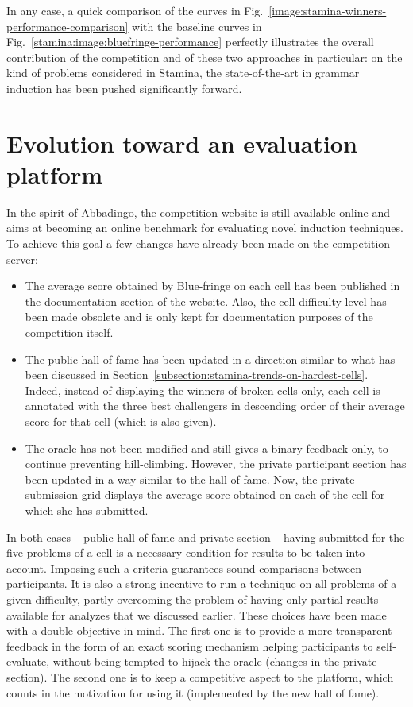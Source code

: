 In any case, a quick comparison of the curves in Fig.~\ref{image:stamina-winners-performance-comparison} with the baseline curves in Fig.~\ref{stamina:image:bluefringe-performance} perfectly illustrates the overall contribution of the competition and of these two approaches in particular: on the kind of problems considered in Stamina, the state-of-the-art in grammar induction has been pushed significantly forward.


\section{Evolution toward an evaluation platform\label{section:stamina-platform}}

In the spirit of Abbadingo, the competition website is still available online and aims at becoming an online benchmark for evaluating novel induction techniques. To achieve this goal a few changes have already been made on the competition server:

\begin{itemize}

\item The average score obtained by Blue-fringe on each cell has been published in the documentation section of the website. Also, the cell difficulty level has been made obsolete and is only kept for documentation purposes of the competition itself.

\item The public hall of fame has been updated in a direction similar to what has been discussed in Section~\ref{subsection:stamina-trends-on-hardest-cells}. Indeed, instead of displaying the winners of broken cells only, each cell is annotated with the three best challengers in descending order of their average score for that cell (which is also given). 

\item The oracle has not been modified and still gives a binary feedback only, to continue preventing hill-climbing. However, the private participant section has been updated in a way similar to the hall of fame. Now, the private submission grid displays the average score obtained on each of the cell for which she has submitted.

\end{itemize}

In both cases -- public hall of fame and private section -- having submitted for the five problems of a cell is a necessary condition for results to be taken into account. Imposing such a criteria guarantees sound comparisons between participants. It is also a strong incentive to run a technique on all problems of a given difficulty, partly overcoming the problem of having only partial results available for analyzes that we discussed earlier. These choices have been made with a double objective in mind. The first one is to provide a more transparent feedback in the form of an exact scoring mechanism helping participants to self-evaluate, without being tempted to hijack the oracle (changes in the private section). The second one is to keep a competitive aspect to the platform, which counts in the motivation for using it (implemented by the new hall of fame). 

